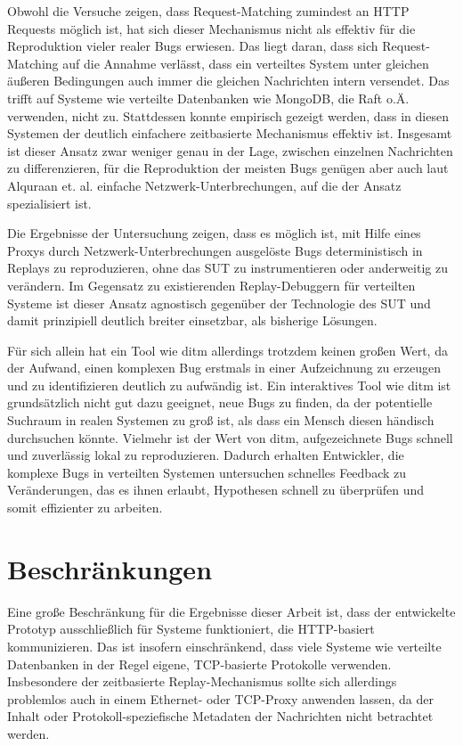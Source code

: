 \documentclass[12pt,a4paper]{report}
\begin{document}
Obwohl die Versuche zeigen, dass Request-Matching zumindest an HTTP Requests möglich ist, hat sich dieser Mechanismus nicht als
effektiv für die Reproduktion vieler realer Bugs erwiesen. Das liegt daran, dass sich Request-Matching auf die Annahme verlässt,
dass ein verteiltes System unter gleichen äußeren Bedingungen auch immer die gleichen Nachrichten intern versendet. Das trifft auf
Systeme wie verteilte Datenbanken wie MongoDB, die Raft o.Ä. verwenden, nicht zu. Stattdessen konnte empirisch gezeigt werden,
dass in diesen Systemen der deutlich einfachere zeitbasierte Mechanismus effektiv ist. Insgesamt ist dieser Ansatz zwar weniger genau
in der Lage, zwischen einzelnen Nachrichten zu differenzieren, für die Reproduktion der meisten Bugs genügen aber auch laut Alquraan et. al.
\cite{analysis_of_network_partition_failures} einfache Netzwerk-Unterbrechungen, auf die der Ansatz spezialisiert ist.

Die Ergebnisse der Untersuchung zeigen, dass es möglich ist, mit Hilfe eines Proxys durch Netzwerk-Unterbrechungen
ausgelöste Bugs deterministisch in Replays zu reproduzieren, ohne das SUT zu instrumentieren oder anderweitig zu verändern.
Im Gegensatz zu existierenden Replay-Debuggern für verteilten Systeme ist dieser Ansatz agnostisch gegenüber der Technologie des
SUT und damit prinzipiell deutlich breiter einsetzbar, als bisherige Lösungen.

Für sich allein hat ein Tool wie ditm allerdings trotzdem keinen großen Wert, da der Aufwand, einen komplexen Bug erstmals in
einer Aufzeichnung zu erzeugen und zu identifizieren deutlich zu aufwändig ist. Ein interaktives Tool wie ditm ist grundsätzlich
nicht gut dazu geeignet, neue Bugs zu finden, da der potentielle Suchraum in realen Systemen zu groß ist, als dass ein Mensch
diesen händisch durchsuchen könnte. Vielmehr ist der Wert von ditm, aufgezeichnete Bugs schnell und zuverlässig lokal zu
reproduzieren. Dadurch erhalten Entwickler, die komplexe Bugs in verteilten Systemen untersuchen schnelles Feedback zu
Veränderungen, das es ihnen erlaubt, Hypothesen schnell zu überprüfen und somit effizienter zu arbeiten.

\section{Beschränkungen}
Eine große Beschränkung für die Ergebnisse dieser Arbeit ist, dass der entwickelte Prototyp ausschließlich für Systeme
funktioniert, die HTTP-basiert kommunizieren. Das ist insofern einschränkend, dass viele Systeme wie verteilte Datenbanken in der
Regel eigene, TCP-basierte Protokolle verwenden. Insbesondere der zeitbasierte Replay-Mechanismus sollte sich allerdings
problemlos auch in einem Ethernet- oder TCP-Proxy anwenden lassen, da der Inhalt oder Protokoll-speziefische Metadaten der
Nachrichten nicht betrachtet werden.
\end{document}
